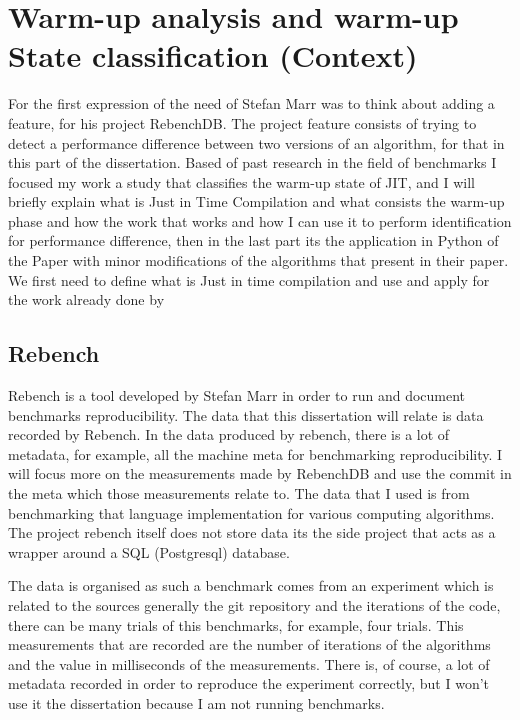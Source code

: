 \documentclass{article}
\begin{document}
\section{ Warm-up analysis and warm-up State classification (Context)}

For the first expression of the need of Stefan Marr was to think about adding a feature, for his project RebenchDB. The project feature consists of trying to detect a performance difference between two versions of an algorithm, for that in this part of the dissertation. Based of past research in the field of benchmarks I focused my work a study that classifies the warm-up state of JIT, and I will briefly explain what is Just in Time Compilation and what consists the warm-up phase and how the work that \citep{barrett2017virtual} works and how I can use it to perform identification for performance difference, then in the last part its the application in Python of the Paper with minor modifications of the algorithms that \citep{barrett2017virtual} present in their paper. We first need to define what is Just in time compilation and use and apply for the work already done by \citep{barrett2017virtual}

\subsection{Rebench}

Rebench is a tool developed by Stefan Marr in order to run and document benchmarks reproducibility. The data that this dissertation will relate is data recorded by Rebench. In the data produced by rebench, there is a lot of metadata, for example, all the machine meta for benchmarking reproducibility. I will focus more on the measurements made by RebenchDB and use the commit in the meta which those measurements relate to. The data that I used is from benchmarking that language implementation for various computing algorithms. The project rebench itself does not store data its the side project that acts as a wrapper around a SQL (Postgresql) database.

The data is organised as such a benchmark comes from an experiment which is related to the sources generally the git repository and the iterations of the code, there can be many trials of this benchmarks, for example, four trials. This measurements that are recorded are the number of iterations of the algorithms and the value in milliseconds of the measurements. There is, of course, a lot of metadata recorded in order to reproduce the experiment correctly, but I won't use it the dissertation because I am not running benchmarks.
\end{document}
